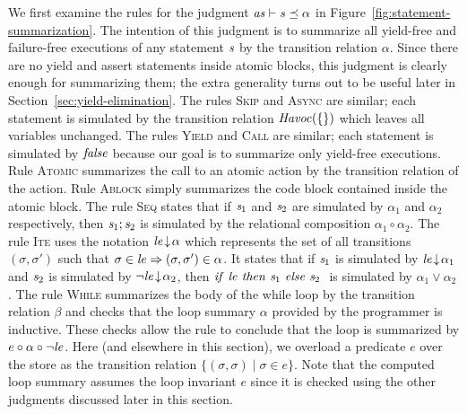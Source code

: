 We first examine the rules for the judgment $\mathit{as} \vdash \mathit{s} \preceq \alpha$ in Figure~\ref{fig:statement-summarization}.
The intention of this judgment is to summarize all yield-free and failure-free executions of any statement $\mathit{s}$ by the transition relation $\alpha$.
Since there are no yield and assert statements inside atomic blocks, this judgment is clearly enough for summarizing them;
the extra generality turns out to be useful later in Section~\ref{sec:yield-elimination}.
The rules \textsc{Skip} and \textsc{Async} are similar;
each statement is simulated by the transition relation $\mathit{Havoc}(\{\})$ which leaves all variables unchanged.
The rules \textsc{Yield} and \textsc{Call} are similar;
each statement is simulated by $\mathit{false}$ because our goal is to summarize only yield-free executions.
Rule \textsc{Atomic} summarizes the call to an atomic action by the transition relation of the action.
Rule \textsc{Ablock} simply summarizes the code block contained inside the atomic block.
The rule \textsc{Seq} states that if $\mathit{s}_1$ and $\mathit{s}_2$ are simulated by $\alpha_1$ and $\alpha_2$ respectively, 
then $\mathit{s}_1;\mathit{s}_2$ is simulated by the relational composition $\alpha_1 \circ \alpha_2$.
The rule \textsc{Ite} uses the notation ${\mathit{le}}\!\downarrow\!{\alpha}$ which represents the set of all transitions $(\sigma, \sigma')$ 
such that $\sigma \in \mathit{le} \Rightarrow (\sigma,\sigma') \in \alpha$.
It states that if $\mathit{s}_1$ is simulated by ${\mathit{le}}\!\downarrow\!{\alpha_1}$ and $\mathit{s}_2$ is simulated by ${\neg \mathit{le}}\!\downarrow\!{\alpha_2}$,
then ${\mathit{if}\ {\mathit{le}}\ }{\mathit{then}\ {\mathit{s}_1}\ }{\mathit{else}\ {\mathit{s}_2}\ }$ is simulated by $\alpha_1 \vee \alpha_2$.
The rule \textsc{While} summarizes the body of the while loop by the transition relation $\beta$ and checks that the 
loop summary $\alpha$ provided by the programmer is inductive.
These checks allow the rule to conclude that the loop is summarized by $e \circ \alpha \circ \neg \mathit{le}$.
Here (and elsewhere in this section), we overload a predicate $e$ over the store as the transition relation $\{(\sigma,\sigma) \mid \sigma \in e\}$.
Note that the computed loop summary assumes the loop invariant $e$ since it is checked using the other judgments discussed later in this section.

